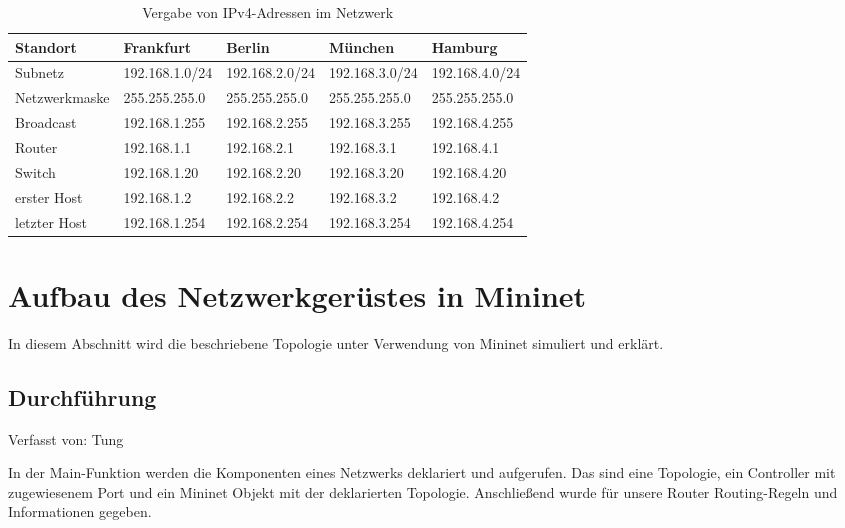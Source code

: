 \documentclass[fontsize=12pt,paper=a4,open=any,parskip=half,
  twoside=false,toc=listof,toc=bibliography,fleqn,leqno,
  captions=nooneline,captions=tableabove,british]{scrbook}
\begin{document}
\begin{table}[H]
	\caption{Vergabe von IPv4-Adressen im Netzwerk}
	\label{netzwerkplan-addressen}
	\centering
	\hspace*{-1cm}
	\begin{tabular}{p{3.5cm} p{3cm} p{3cm} p{3cm} p{3cm}}
		\toprule
		 Standort & Frankfurt & Berlin  & München & Hamburg \\
		\midrule 
		Subnetz & 192.168.1.0/24 &  192.168.2.0/24 & 192.168.3.0/24 & 192.168.4.0/24\\
		
		Netzwerkmaske	&255.255.255.0& 255.255.255.0& 255.255.255.0	& 255.255.255.0 \\
		
		Broadcast & 192.168.1.255 &	192.168.2.255 &	192.168.3.255 & 192.168.4.255\\
		
		Router & 192.168.1.1&192.168.2.1& 192.168.3.1 &192.168.4.1\\
		
		Switch & 192.168.1.20& 192.168.2.20&192.168.3.20&	192.168.4.20\\
		
		erster Host& 192.168.1.2& 192.168.2.2& 192.168.3.2&192.168.4.2\\
		
		letzter Host& 192.168.1.254 & 192.168.2.254 & 192.168.3.254 & 192.168.4.254\\
		
	\end{tabular}
	
\end{table}

\section{Aufbau des Netzwerkgerüstes in Mininet}
In diesem Abschnitt wird die beschriebene Topologie unter Verwendung von Mininet simuliert und erklärt.

\subsection{Durchführung}
{\tiny Verfasst von: Tung\par}
In der Main-Funktion werden die Komponenten eines Netzwerks deklariert und aufgerufen. Das sind eine Topologie, ein Controller mit zugewiesenem Port und ein Mininet Objekt mit der deklarierten Topologie. Anschließend wurde für unsere Router Routing-Regeln und Informationen gegeben.
\end{document}
